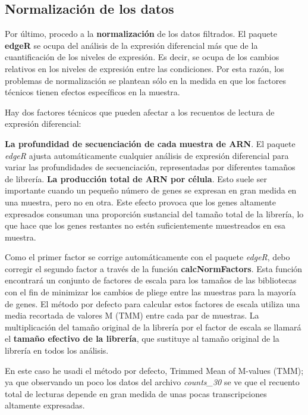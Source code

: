 \documentclass[]{article}
\begin{document}
\hypertarget{normalizaciuxf3n-de-los-datos}{%
\subsection{Normalización de los
datos}\label{normalizaciuxf3n-de-los-datos}}

Por último, procedo a la \textbf{normalización} de los datos filtrados.
El paquete \textbf{edgeR} se ocupa del análisis de la expresión
diferencial más que de la cuantificación de los niveles de expresión. Es
decir, se ocupa de los cambios relativos en los niveles de expresión
entre las condiciones. Por esta razón, los problemas de normalización se
plantean sólo en la medida en que los factores técnicos tienen efectos
específicos en la muestra.

Hay dos factores técnicos que pueden afectar a los recuentos de lectura
de expresión diferencial:

\textbf{La profundidad de secuenciación de cada muestra de ARN}. El
paquete \emph{edgeR} ajusta automáticamente cualquier análisis de
expresión diferencial para variar las profundidades de secuenciación,
representadas por diferentes tamaños de librería. \textbf{La producción
total de ARN por célula}. Esto suele ser importante cuando un pequeño
número de genes se expresan en gran medida en una muestra, pero no en
otra. Este efecto provoca que los genes altamente expresados consuman
una proporción sustancial del tamaño total de la librería, lo que hace
que los genes restantes no estén suficientemente muestreados en esa
muestra.

Como el primer factor se corrige automáticamente con el paquete
\emph{edgeR}, debo corregir el segundo factor a través de la función
\textbf{calcNormFactors}. Esta función encontrará un conjunto de
factores de escala para los tamaños de las bibliotecas con el fin de
minimizar los cambios de pliege entre las muestras para la mayoría de
genes. El método por defecto para calcular estos factores de escala
utiliza una media recortada de valores M (TMM) entre cada par de
muestras. La multiplicación del tamaño original de la librería por el
factor de escala se llamará el \textbf{tamaño efectivo de la librería},
que sustituye al tamaño original de la librería en todos los análisis.

En este caso he usadi el método por defecto, Trimmed Mean of M-values
(TMM); ya que observando un poco los datos del archivo \emph{counts\_30}
se ve que el recuento total de lecturas depende en gran medida de unas
pocas transcripciones altamente expresadas.
\end{document}
